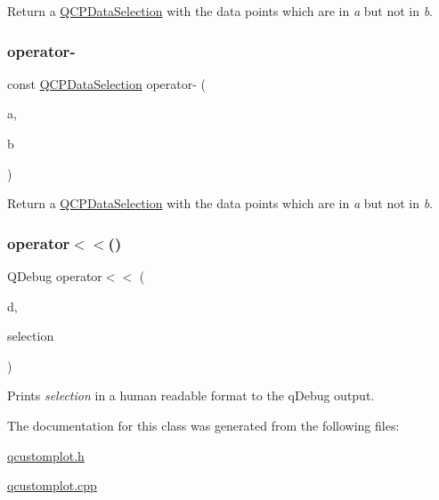 Return a \hyperlink{class_q_c_p_data_selection}{Q\+C\+P\+Data\+Selection} with the data points which are in {\itshape a} but not in {\itshape b}. \mbox{\label{class_q_c_p_data_selection_ad62dd67b505c1fa9c02d1aafabcb9acf}} 
\subsubsection{\texorpdfstring{operator-\/}{operator-}\hspace{0.1cm}{\footnotesize\ttfamily [4/4]}}
{\footnotesize\ttfamily const \hyperlink{class_q_c_p_data_selection}{Q\+C\+P\+Data\+Selection} operator-\/ (\begin{DoxyParamCaption}\item[{const \hyperlink{class_q_c_p_data_range}{Q\+C\+P\+Data\+Range} \&}]{a,  }\item[{const \hyperlink{class_q_c_p_data_range}{Q\+C\+P\+Data\+Range} \&}]{b }\end{DoxyParamCaption})\hspace{0.3cm}{\ttfamily [friend]}}

Return a \hyperlink{class_q_c_p_data_selection}{Q\+C\+P\+Data\+Selection} with the data points which are in {\itshape a} but not in {\itshape b}. \mbox{\label{class_q_c_p_data_selection_aed65b8988afe6b03adeadf5edf663670}} 
\subsubsection{\texorpdfstring{operator$<$$<$()}{operator<<()}}
{\footnotesize\ttfamily Q\+Debug operator$<$$<$ (\begin{DoxyParamCaption}\item[{Q\+Debug}]{d,  }\item[{const \hyperlink{class_q_c_p_data_selection}{Q\+C\+P\+Data\+Selection} \&}]{selection }\end{DoxyParamCaption})\hspace{0.3cm}{\ttfamily [related]}}

Prints {\itshape selection} in a human readable format to the q\+Debug output. 

The documentation for this class was generated from the following files\+:\begin{DoxyCompactItemize}
\item 
\hyperlink{qcustomplot_8h}{qcustomplot.\+h}\item 
\hyperlink{qcustomplot_8cpp}{qcustomplot.\+cpp}\end{DoxyCompactItemize}
